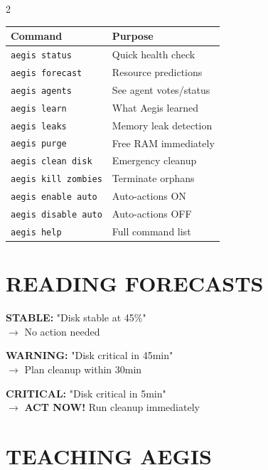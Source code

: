 \documentclass[11pt,a4paper]{article}
\newcommand{\cmd}[1]{\texttt{\textcolor{aegisblue}{#1}}}
\begin{document}
\begin{multicols}{2}
\begin{tabular}{@{}p{3.2cm}p{4.3cm}@{}}
\toprule
\textbf{Command} & \textbf{Purpose} \\
\midrule
\cmd{aegis status} & Quick health check \\
\cmd{aegis forecast} & Resource predictions \\
\cmd{aegis agents} & See agent votes/status \\
\cmd{aegis learn} & What Aegis learned \\
\cmd{aegis leaks} & Memory leak detection \\
\midrule
\cmd{aegis purge} & Free RAM immediately \\
\cmd{aegis clean disk} & Emergency cleanup \\
\cmd{aegis kill zombies} & Terminate orphans \\
\midrule
\cmd{aegis enable auto} & Auto-actions ON \\
\cmd{aegis disable auto} & Auto-actions OFF \\
\cmd{aegis help} & Full command list \\
\bottomrule
\end{tabular}

\section*{\textcolor{aegisblue}{\faLineChart} READING FORECASTS}

\begin{mdframed}[backgroundcolor=green!10,linewidth=0.3pt]
\textbf{STABLE:} "Disk stable at 45\%"\\
$\rightarrow$ No action needed
\end{mdframed}

\begin{mdframed}[backgroundcolor=yellow!10,linewidth=0.3pt]
\textbf{WARNING:} "Disk critical in 45min"\\
$\rightarrow$ Plan cleanup within 30min
\end{mdframed}

\begin{mdframed}[backgroundcolor=red!10,linewidth=0.3pt]
\textbf{CRITICAL:} "Disk critical in 5min"\\
$\rightarrow$ \textbf{ACT NOW!} Run cleanup immediately
\end{mdframed}

\section*{\textcolor{aegisblue}{\faGraduationCap} TEACHING AEGIS}


\end{multicols}
\end{document}

